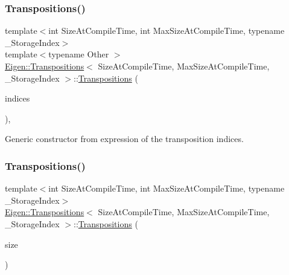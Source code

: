 \subsubsection{\texorpdfstring{Transpositions()}{Transpositions()}\hspace{0.1cm}{\footnotesize\ttfamily [3/4]}}
{\footnotesize\ttfamily template$<$int Size\+At\+Compile\+Time, int Max\+Size\+At\+Compile\+Time, typename \+\_\+\+Storage\+Index$>$ \\
template$<$typename Other $>$ \\
\mbox{\hyperlink{class_eigen_1_1_transpositions}{Eigen\+::\+Transpositions}}$<$ Size\+At\+Compile\+Time, Max\+Size\+At\+Compile\+Time, \+\_\+\+Storage\+Index $>$\+::\mbox{\hyperlink{class_eigen_1_1_transpositions}{Transpositions}} (\begin{DoxyParamCaption}\item[{const \mbox{\hyperlink{class_eigen_1_1_matrix_base}{Matrix\+Base}}$<$ Other $>$ \&}]{indices }\end{DoxyParamCaption})\hspace{0.3cm}{\ttfamily [inline]}, {\ttfamily [explicit]}}

Generic constructor from expression of the transposition indices. \mbox{\label{class_eigen_1_1_transpositions_a6a02dae883f9bc072de3268e1696d0ba}} 
\subsubsection{\texorpdfstring{Transpositions()}{Transpositions()}\hspace{0.1cm}{\footnotesize\ttfamily [4/4]}}
{\footnotesize\ttfamily template$<$int Size\+At\+Compile\+Time, int Max\+Size\+At\+Compile\+Time, typename \+\_\+\+Storage\+Index$>$ \\
\mbox{\hyperlink{class_eigen_1_1_transpositions}{Eigen\+::\+Transpositions}}$<$ Size\+At\+Compile\+Time, Max\+Size\+At\+Compile\+Time, \+\_\+\+Storage\+Index $>$\+::\mbox{\hyperlink{class_eigen_1_1_transpositions}{Transpositions}} (\begin{DoxyParamCaption}\item[{\mbox{\hyperlink{class_eigen_1_1_transpositions_base_a3f5f06118b419e8e6ccbe49ed5b4c91f}{Index}}}]{size }\end{DoxyParamCaption})\hspace{0.3cm}{\ttfamily [inline]}}


